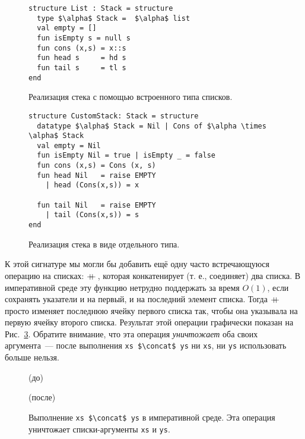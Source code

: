 \begin{figure}
\begin{lstlisting}
structure List : Stack = structure
  type $\alpha$ Stack =  $\alpha$ list
  val empty = []
  fun isEmpty s = null s
  fun cons (x,s) = x::s
  fun head s     = hd s
  fun tail s     = tl s
end
\end{lstlisting}
\caption{Реализация стека с помощью встроенного типа списков.}\label{fig:2.2}
\end{figure}

\begin{figure}
\begin{lstlisting}
structure CustomStack: Stack = structure
  datatype $\alpha$ Stack = Nil | Cons of $\alpha \times \alpha$ Stack
  val empty = Nil
  fun isEmpty Nil = true | isEmpty _ = false
  fun cons (x,s) = Cons (x, s)
  fun head Nil   = raise EMPTY
    | head (Cons(x,s)) = x
    
  fun tail Nil   = raise EMPTY
    | tail (Cons(x,s)) = s
end
\end{lstlisting}
  \caption{Реализация стека в виде отдельного типа.}
  \label{fig:2.3}
\end{figure}

К этой сигнатуре мы могли бы добавить ещё одну часто встречающуюся
операцию на списках: $+\!\!\!+\,$, которая конкатенирует (т. е.,
соединяет) два списка. В императивной среде эту функцию нетрудно
поддержать за время $O(1)$, если сохранять указатели и на первый, и на
последний элемент списка.  Тогда $+\!\!\!+\,$ просто изменяет последнюю
ячейку первого списка так, чтобы она указывала на первую ячейку
второго списка.  Результат этой операции графически показан на
Рис.~\ref{fig:2.4}. Обратите внимание, что эта операция
\emph{уничтожает} оба своих аргумента~--- после выполнения
\lstinline!xs $\concat$ ys! ни \lstinline!xs!, ни \lstinline!ys! использовать
больше нельзя.

\begin{figure}[h]
  \centering
	\par
  (до)\par
	\vspace{0.5cm}
	\par
  (после)\par
	\vspace{0.5cm}
  \caption{Выполнение \lstinline!xs $\concat$ ys! в императивной среде. Эта операция уничтожает списки-аргументы \lstinline!xs! и \lstinline!ys!.}
  \label{fig:2.4}
\end{figure}

